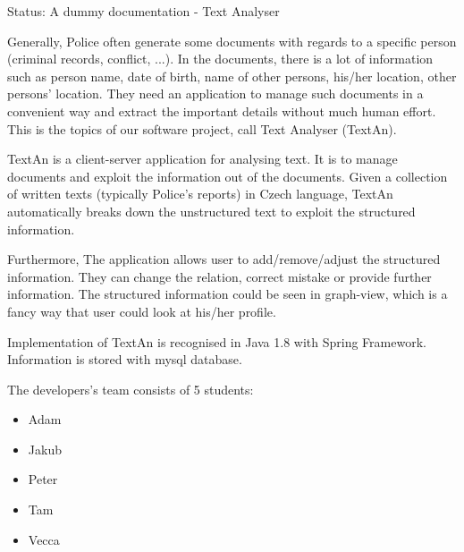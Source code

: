 Status: A dummy documentation - Text Analyser

Generally, Police often generate some documents with regards to a specific person (criminal records, conflict, ...). 
In the documents, there is a lot of information such as person name, date of birth, name of other persons, his/her 
location, other persons' location. They need an application to manage such documents in a convenient way and extract the 
important details without much human effort. This is the topics of our software project, call Text Analyser (TextAn).

TextAn is a client-server application for analysing text. It is to manage documents and exploit the information out of the 
documents. Given a collection of written texts (typically Police's reports) in Czech language, TextAn automatically breaks 
down the unstructured text to exploit the structured information. 

Furthermore, The application allows user to add/remove/adjust the structured information. They can change the relation, 
correct mistake or provide further information. The structured information could be seen in graph-view, which is a fancy 
way that user could look at his/her profile. 

Implementation of TextAn is recognised in Java 1.8 with Spring Framework. Information is stored with mysql database.

The developers's team consists of 5 students:

\begin{itemize}
\item Adam
\item Jakub
\item Peter
\item Tam
\item Vecca
\end{itemize}
